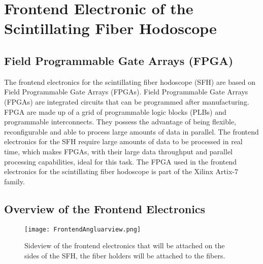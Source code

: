 \chapter{Frontend Electronic of the Scintillating Fiber Hodoscope}\label{cha:frontend}

\noindent
\section{Field Programmable Gate Arrays (FPGA)}\label{sec:FPGA}
The frontend electronics for the scintillating fiber hodoscope (SFH) are based on Field Programmable Gate Arrays (FPGAs).
Field Programmable Gate Arrays (FPGAs) are integrated circuits that can be programmed after manufacturing.
FPGA are made up of a grid of programmable logic blocks (PLBs) and programmable interconnects.
They possess the advantage of being flexible, reconfigurable and able to process large amounts of data in parallel.
The frontend electronics for the SFH require large amounts of data to be processed in real time, which makes FPGAs, with their large data throughput and parallel processing capabilities, ideal for this task.\autocite{FPGA_reviewDSP}
\newline
The FPGA used in the frontend electronics for the scintillating fiber hodoscope is part of the Xilinx Artix-7 family.\autocite{InternalcommunicationIgor}
\section{Overview of the Frontend Electronics}
\begin{figure}[h]
    \centering
    \texttt{[image: FrontendAngluarview.png]}
    \caption{Sideview of the frontend electronics that will be attached on the sides of the SFH, the fiber holders will be attached to the fibers.\autocite{InternalcommunicationKarl} }
    \label{fig:SideviewModelElectronics}
    \end{figure}
